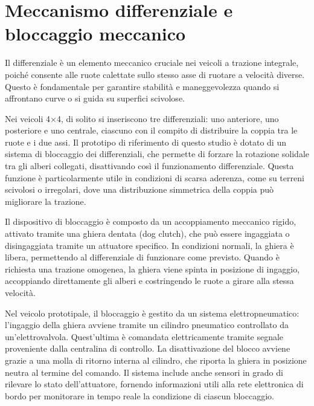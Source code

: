 \documentclass[11pt]{report}
\begin{document}
	\section{Meccanismo differenziale e bloccaggio meccanico}
	Il differenziale è un elemento meccanico cruciale nei veicoli a trazione integrale, poiché consente alle ruote calettate sullo stesso asse di ruotare a velocità diverse. Questo è fondamentale per garantire stabilità e maneggevolezza quando si affrontano curve o si guida su superfici scivolose. 
	
	Nei veicoli 4×4, di solito si inseriscono tre differenziali: uno anteriore, uno posteriore e uno centrale, ciascuno con il compito di distribuire la coppia tra le ruote e i due assi. Il prototipo di riferimento di questo studio è dotato di un sistema di bloccaggio dei differenziali, che permette di forzare la rotazione solidale tra gli alberi collegati, disattivando così il funzionamento differenziale. Questa funzione è particolarmente utile in condizioni di scarsa aderenza, come su terreni scivolosi o irregolari, dove una distribuzione simmetrica della coppia può migliorare la trazione.
	
	Il dispositivo di bloccaggio è composto da un accoppiamento meccanico rigido, attivato tramite una ghiera dentata (dog clutch), che può essere ingaggiata o disingaggiata tramite un attuatore specifico. In condizioni normali, la ghiera è libera, permettendo al differenziale di funzionare come previsto. Quando è richiesta una trazione omogenea, la ghiera viene spinta in posizione di ingaggio, accoppiando direttamente gli alberi e costringendo le ruote a girare alla stessa velocità.
	
	Nel veicolo prototipale, il bloccaggio è gestito da un sistema elettropneumatico: l’ingaggio della ghiera avviene tramite un cilindro pneumatico controllato da un’elettrovalvola. Quest’ultima è comandata elettricamente tramite segnale proveniente dalla centralina di controllo. La disattivazione del blocco avviene grazie a una molla di ritorno interna al cilindro, che riporta la ghiera in posizione neutra al termine del comando. Il sistema include anche sensori in grado di rilevare lo stato dell’attuatore, fornendo informazioni utili alla rete elettronica di bordo per monitorare in tempo reale la condizione di ciascun bloccaggio.
	
	
	
	
\end{document}
